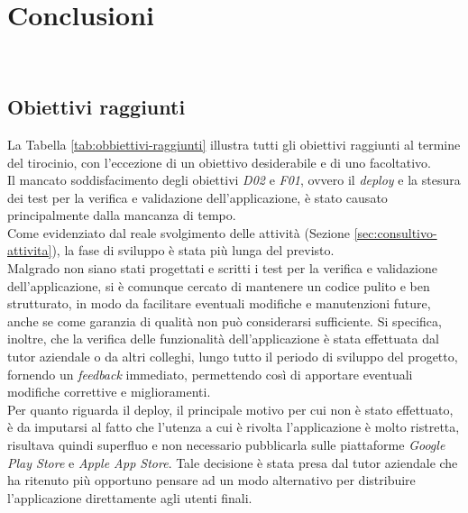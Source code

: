 \chapter{Conclusioni}
\label{cap:conclusioni}

\\

\section{Obiettivi raggiunti}
\label{sec:raggiungimento-obiettivi}

La Tabella \ref{tab:obbiettivi-raggiunti} illustra tutti gli obiettivi raggiunti al termine del tirocinio, con l'eccezione di un obiettivo desiderabile e di uno facoltativo.\\
Il mancato soddisfacimento degli obiettivi \emph{D02} e \emph{F01}, ovvero il \emph{deploy} e la stesura dei test per la verifica e validazione dell'applicazione, è stato causato principalmente dalla mancanza di tempo. \\
Come evidenziato dal reale svolgimento delle attività (Sezione \ref{sec:consultivo-attivita}), la fase di sviluppo è stata più lunga del previsto.\\
Malgrado non siano stati progettati e scritti i test per la verifica e validazione dell'applicazione, si è comunque cercato di mantenere un codice pulito e ben strutturato, in modo da facilitare eventuali modifiche e manutenzioni future, anche se come garanzia di qualità non può considerarsi sufficiente.
Si specifica, inoltre, che la verifica delle funzionalità dell'applicazione è stata effettuata dal tutor aziendale o da altri colleghi, lungo tutto il periodo di sviluppo del progetto, fornendo un \emph{feedback} immediato, permettendo così di apportare eventuali modifiche correttive e miglioramenti.\\
Per quanto riguarda il \gls{deploy}\glsoccur, il principale motivo per cui non è stato effettuato, è da imputarsi al fatto che l'utenza a cui è rivolta l'applicazione è molto ristretta, risultava quindi superfluo e non necessario pubblicarla sulle piattaforme \emph{Google Play Store} e \emph{Apple App Store}. Tale decisione è stata presa dal tutor aziendale che ha ritenuto più opportuno pensare ad un modo alternativo per distribuire l'applicazione direttamente agli utenti finali.

